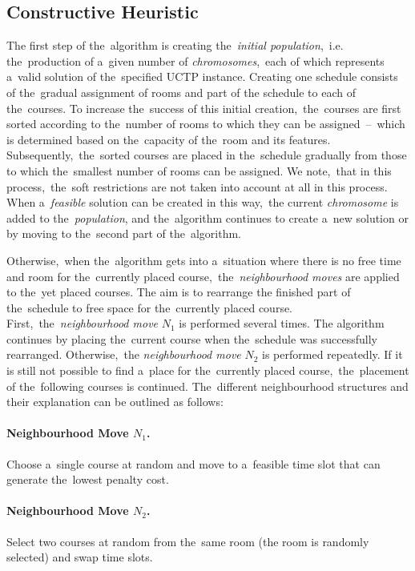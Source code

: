 \subsection{Constructive Heuristic} \label{sec:const}
The first step of the~algorithm is creating the~\textit{initial population},~i.e. the~production of a~given number of \textit{chromosomes},~each of which represents a~valid solution of the~specified UCTP instance.
Creating one schedule consists of the~gradual assignment of rooms and part of the schedule to each of the~courses.
To increase the~success of this initial creation,~the~courses are first sorted according to the~number of rooms to which they can be assigned \,--\, which is determined based on the~capacity of the~room and its features.
Subsequently,~the~sorted courses are placed in the~schedule gradually from those to which the~smallest number of rooms can be assigned.
We note,~that in this process,~the~soft restrictions are not taken into account at all in this process.
When a~\textit{feasible} solution can be created in this way,~the current \textit{chromosome} is added to the~\textit{population}, and the~algorithm continues to create a~new solution or by moving to the~second part of the~algorithm.

Otherwise,~when the~algorithm gets into a~situation where there is no free time and room for the~currently placed course,~the~\textit{neighbourhood moves} are applied to the~yet placed courses.
The aim is to rearrange the finished part of the~schedule to free space for the~currently placed course.
First,~the~\textit{neighbourhood move} $N_1$ is performed several times. The algorithm continues by placing the~current course when the~schedule was successfully rearranged.
Otherwise,~the \textit{neighbourhood move} $N_2$ is performed repeatedly.
If it is still not possible to find a~place for the~currently placed course,~the~placement of the~following courses is continued.
The~different neighbourhood structures and their explanation can be outlined as follows:

\paragraph{Neighbourhood Move $N_1$.}
Choose a~single course at random and move to a~feasible time slot that can generate the~lowest penalty cost.

\paragraph{Neighbourhood Move $N_2$.}
Select two courses at random from the~same room (the room is randomly selected) and swap time slots.

